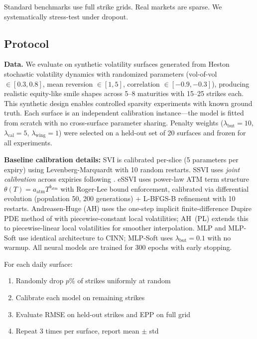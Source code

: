 \documentclass[11pt,a4paper]{article}
\begin{document}
Standard benchmarks use full strike grids. Real markets are sparse. We systematically stress-test under dropout.

\subsection{Protocol}

\textbf{Data.} We evaluate on synthetic volatility surfaces generated from Heston stochastic volatility dynamics with randomized parameters (vol-of-vol $\in [0.3, 0.8]$, mean reversion $\in [1, 5]$, correlation $\in [-0.9, -0.3]$), producing realistic equity-like smile shapes across 5--8 maturities with 15--25 strikes each. This synthetic design enables controlled sparsity experiments with known ground truth. Each surface is an independent calibration instance---the model is fitted from scratch with no cross-surface parameter sharing. Penalty weights ($\lambda_{\text{but}} = 10$, $\lambda_{\text{cal}} = 5$, $\lambda_{\text{wing}} = 1$) were selected on a held-out set of 20 surfaces and frozen for all experiments.

\textbf{Baseline calibration details:} SVI is calibrated per-slice (5 parameters per expiry) using Levenberg-Marquardt with 10 random restarts. SSVI uses \textit{joint calibration} across expiries following \citet{gatheral2014}. eSSVI \citep{hendriks2019} uses power-law ATM term structure $\theta(T) = a_{\text{atm}} T^{b_{\text{atm}}}$ with Roger-Lee bound enforcement, calibrated via differential evolution (population 50, 200 generations) + L-BFGS-B refinement with 10 restarts. Andreasen-Huge (AH) uses the one-step implicit finite-difference Dupire PDE method of \citet{andreasen2011} with piecewise-constant local volatilities; AH~(PL) extends this to piecewise-linear local volatilities for smoother interpolation. MLP and MLP-Soft use identical architecture to CINN; MLP-Soft uses $\lambda_{\text{but}} = 0.1$ with no warmup. All neural models are trained for 300 epochs with early stopping.

For each daily surface:
\begin{enumerate}
    \item Randomly drop $p\%$ of strikes uniformly at random
    \item Calibrate each model on remaining strikes
    \item Evaluate RMSE on held-out strikes and EPP on full grid
    \item Repeat 3 times per surface, report mean $\pm$ std
\end{enumerate}
\end{document}
